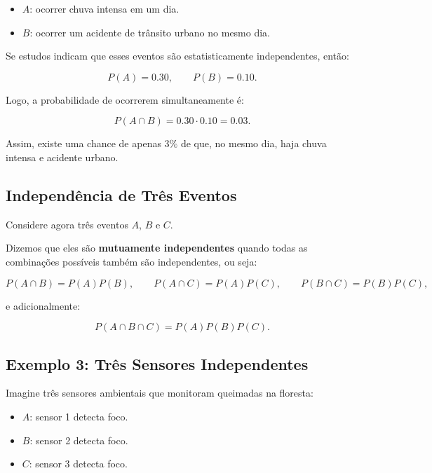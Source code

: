 \begin{itemize}
\item $A$: ocorrer chuva intensa em um dia.
\item $B$: ocorrer um acidente de trânsito urbano no mesmo dia.
\end{itemize}

Se estudos indicam que esses eventos são estatisticamente independentes, então:

\[
P(A)=0.30,
\qquad
P(B)=0.10.
\]

Logo, a probabilidade de ocorrerem simultaneamente é:

\begin{equation}
P(A\cap B)=0.30\cdot0.10=0.03.
\end{equation}

Assim, existe uma chance de apenas $3\%$ de que, no mesmo dia, haja
chuva intensa e acidente urbano.


\newpage
\subsection*{Independência de Três Eventos}

Considere agora três eventos $A$, $B$ e $C$.

Dizemos que eles são \textbf{mutuamente independentes} quando todas as combinações
possíveis também são independentes, ou seja:

\begin{equation}
P(A\cap B)=P(A)P(B),
\qquad
P(A\cap C)=P(A)P(C),
\qquad
P(B\cap C)=P(B)P(C),
\end{equation}

e adicionalmente:

\begin{equation}
P(A\cap B\cap C)=P(A)P(B)P(C).
\end{equation}


\subsection*{Exemplo 3: Três Sensores Independentes}

Imagine três sensores ambientais que monitoram queimadas na floresta:

\begin{itemize}
\item $A$: sensor 1 detecta foco.
\item $B$: sensor 2 detecta foco.
\item $C$: sensor 3 detecta foco.
\end{itemize}

